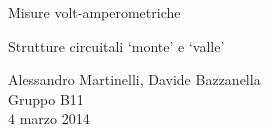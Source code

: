 \begin{center}

     	{\huge Misure volt-amperometriche}

     	\vspace{0.2cm}
     	{\LARGE Strutture circuitali `monte' e `valle'}
	\vspace{0.3cm}

      	{\large Alessandro Martinelli, Davide Bazzanella} \\
		{\large Gruppo B11} \\
	
	\vspace{0.1cm}
      	{\large 4 marzo 2014}

\end{center}
